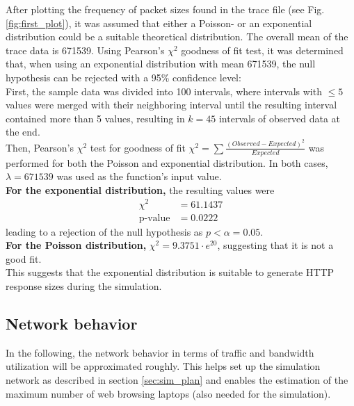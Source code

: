 \documentclass[
10pt, %
a4paper, %
oneside, %
headinclude,footinclude, %
BCOR5mm, %
]{scrartcl}
\begin{document}
After plotting the frequency of packet sizes found in the trace file (see Fig. \ref{fig:first_plot}), it was assumed that either a Poisson- or an exponential distribution could be a suitable theoretical distribution. The overall mean of the trace data is 671539.
Using Pearson's $\chi^2$ goodness of fit test, it was determined that, when using an exponential distribution with mean 671539, the null hypothesis can be rejected with a 95\% confidence level:\\

First, the sample data was divided into 100 intervals, where intervals with $\leq 5$ values were merged with their neighboring interval until the resulting interval contained more than 5 values, resulting in $k = 45$ intervals of observed data at the end.\\

Then, Pearson's $\chi^2$ test for goodness of fit $\chi^2 = \sum \frac{(Observed - Expected)^2}{Expected}$ was performed for both the Poisson and exponential distribution. In both cases, $\lambda = 671539$ was used as the function's input value.\\

\textbf{For the exponential distribution,} the resulting values were
\begin{align*}
\chi^2 &= 61.1437\\
\text{p-value} &= 0.0222
\end{align*}
leading to a rejection of the null hypothesis as $p < \alpha = 0.05$.\\
\textbf{For the Poisson distribution,} $\chi^2 = 9.3751 \cdot e^{20}$, suggesting that it is not a good fit.\\

This suggests that the exponential distribution is suitable to generate HTTP response sizes during the simulation.


\subsection{Network behavior}
In the following, the network behavior in terms of traffic and bandwidth utilization will be approximated roughly.
This helps set up the simulation network as described in section \ref{sec:sim_plan} and enables the estimation of the maximum number of web browsing laptops (also needed for the simulation).
\end{document}
